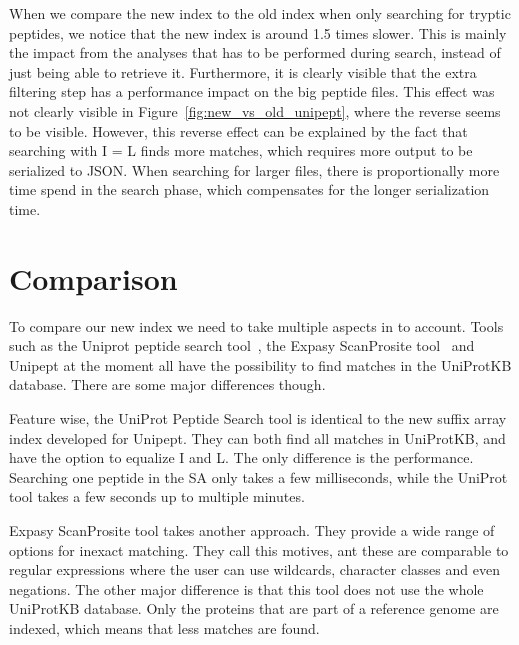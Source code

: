\documentclass[11pt]{article}
\newenvironment{Figure}
{\par\medskip\noindent\minipage{\linewidth}}
{\endminipage\par\medskip}
\begin{document}
\begin{multicols}{2}
\begin{Figure}
{            }
            \label{fig:new_vs_old_unipept}
        \end{Figure}
        When we compare the new index to the old index when only searching for tryptic peptides, we notice that the new index is around 1.5 times slower.
        This is mainly the impact from the analyses that has to be performed during search, instead of just being able to retrieve it.
        Furthermore, it is clearly visible that the extra filtering step has a performance impact on the big peptide files.
        This effect was not clearly visible in Figure~\ref{fig:new_vs_old_unipept}, where the reverse seems to be visible.
        However, this reverse effect can be explained by the fact that searching with I = L finds more matches, which requires more output to be serialized to JSON\@.
        When searching for larger files, there is proportionally more time spend in the search phase, which compensates for the longer serialization time. %

        \section{Comparison}\label{sec:comparison}
        To compare our new index we need to take multiple aspects in to account.
        Tools such as the Uniprot peptide search tool~\cite{uniprot_search_site, uniprot_search_paper}, the Expasy ScanProsite tool~\cite{scanprosite} and Unipept at the moment all have the possibility to find matches in the UniProtKB database.
        There are some major differences though.

        Feature wise, the UniProt Peptide Search tool is identical to the new suffix array index developed for Unipept.
        They can both find all matches in UniProtKB, and have the option to equalize I and L\@.
        The only difference is the performance.
        Searching one peptide in the SA only takes a few milliseconds, while the UniProt tool takes a few seconds up to multiple minutes.

        Expasy ScanProsite tool takes another approach.
        They provide a wide range of options for inexact matching.
        They call this motives, ant these are comparable to regular expressions where the user can use wildcards, character classes and even negations.
        The other major difference is that this tool does not use the whole UniProtKB database.
        Only the proteins that are part of a reference genome are indexed, which means that less matches are found.


\end{multicols}
\end{document}
